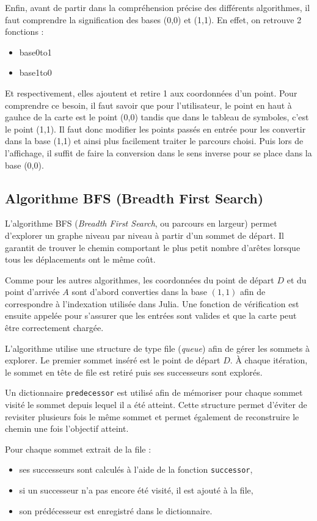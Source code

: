 \documentclass[a4paper,12pt]{article}
\begin{document}
Enfin, avant de partir dans la compréhension précise des différents algorithmes, il faut comprendre la signification des bases (0,0) et (1,1). En effet, on retrouve 2 fonctions :
\begin{itemize}
  \item[] base0to1
  \item[] base1to0
\end{itemize}
Et respectivement, elles ajoutent et retire 1 aux coordonnées d'un point. Pour comprendre ce besoin, il faut savoir que pour l'utilisateur, le point en haut à gauhce de la carte est le point (0,0) tandis que dans le tableau de symboles, c'est le point (1,1). Il faut donc modifier les points passés en entrée pour les convertir dans la base (1,1) et ainsi plus facilement traiter le parcours choisi. Puis lors de l'affichage, il suffit de faire la conversion dans le sens inverse pour se place dans la base (0,0).


\subsection{Algorithme BFS (Breadth First Search)}

L'algorithme BFS (\textit{Breadth First Search}, ou parcours en largeur) permet d'explorer un graphe niveau par niveau à partir d'un sommet de départ. Il garantit de trouver le chemin comportant le plus petit nombre d'arêtes lorsque tous les déplacements ont le même coût.

Comme pour les autres algorithmes, les coordonnées du point de départ $D$ et du point d'arrivée $A$ sont d'abord converties dans la base $(1,1)$ afin de correspondre à l'indexation utilisée dans Julia. Une fonction de vérification est ensuite appelée pour s'assurer que les entrées sont valides et que la carte peut être correctement chargée.

L'algorithme utilise une structure de type file (\textit{queue}) afin de gérer les sommets à explorer. Le premier sommet inséré est le point de départ $D$. À chaque itération, le sommet en tête de file est retiré puis ses successeurs sont explorés.

Un dictionnaire \texttt{predecessor} est utilisé afin de mémoriser pour chaque sommet visité le sommet depuis lequel il a été atteint. Cette structure permet d'éviter de revisiter plusieurs fois le même sommet et permet également de reconstruire le chemin une fois l'objectif atteint.

Pour chaque sommet extrait de la file :
\begin{itemize}
\item ses successeurs sont calculés à l'aide de la fonction \texttt{successor},
\item si un successeur n'a pas encore été visité, il est ajouté à la file,
\item son prédécesseur est enregistré dans le dictionnaire.
\end{itemize}
\end{document}
